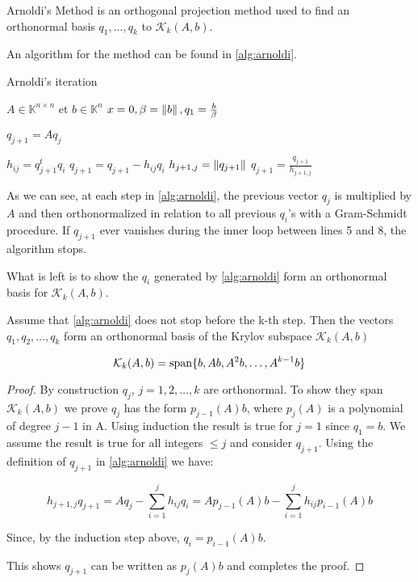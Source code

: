 Arnoldi's Method is an orthogonal projection method used to find an orthonormal basis ${q_{1}, \dots, q_{k}}$ to $\mathcal{K}_{k}(A,b)$.

An algorithm for the method can be found in \ref{alg:arnoldi}.


\begin{algorithm}
    \caption{Arnoldi's iteration}\label{alg:arnoldi}
    \begin{algorithmic}[1]
        \State $A \in \mathbb{K}^{n \times n}$ et $b\in \mathbb{K}^{n}$
        \State $x=0, \beta=\left\lVert b\right\rVert,q_{1}=\frac{b}{\beta}$

        \State $q_{j+1} = Aq_{j}$

        \State $h_{ij}= q_{j+1}^{t}q_{i}$
        \State $q_{j+1} = q_{j+1} - h_{ij}q_{i}$
        \EndFor
        \State $h_{j+1,j}=\left\lVert q_{j+1}\right\rVert$
        \State $q_{j+1} = \frac{q_{j+1}}{h_{j+1,j}}$
        \EndFor

    \end{algorithmic}
\end{algorithm}


As we can see, at each step in \ref{alg:arnoldi}, the previous vector $q_{j}$ is multiplied by $A$ and then orthonormalized in relation to all previous $q_{i}$'s with a Gram-Schmidt procedure. If $q_{j+1}$ ever vanishes during the inner loop between lines 5 and 8, the algorithm stops.

What is left is to show the $q_{i}$ generated by \ref{alg:arnoldi} form an orthonormal basis for $\mathcal{K}_{k}(A,b)$.

\begin{proposition}\label{prop:arnoldi_basis}
    Assume that
    \ref{alg:arnoldi} does not stop before the k-th step. Then the vectors $q_{1}, q_{2},
        \dots, q_{k}$ form an orthonormal basis of the Krylov subspace $\mathcal{K}_{k}(A,b)$

    $$
        \mathcal{K}_{k}(A,b) = \operatorname{span} \{b, Ab, A^{2}b, \dots, A^{k-1}b\}
    $$
\end{proposition}

\begin{proof}\label{proof:arnoldi}
    By construction $q_{j}$, $j = 1,2,\dots, k$ are orthonormal. To show they span $\mathcal{K}_{k}(A,b)$ we prove $q_{j}$ has the form $p_{j-1}(A)b$, where $p_{j}(A)$ is a polynomial of degree $j-1$ in A.
    Using induction the result is true for $j=1$ since $q_{1} = b$. We assume the result is true for all integers $\leq j$ and consider $q_{j+1}$. Using the definition of $q_{j+1}$ in \ref{alg:arnoldi} we have:

    \begin{equation}
        h_{j+1, j}q_{j+1} = Aq_{j} - \sum_{i=1}^{j} h_{ij}q_{i} = Ap_{j-1}(A)b - \sum_{i=1}^{j} h_{ij}p_{i-1}(A)b
    \end{equation}

    Since, by the induction step above, $q_{i} = p_{i-1}(A)b$.

    This shows $q_{j+1}$ can be written as $p_{j}(A)b$ and completes the proof.
\end{proof}

